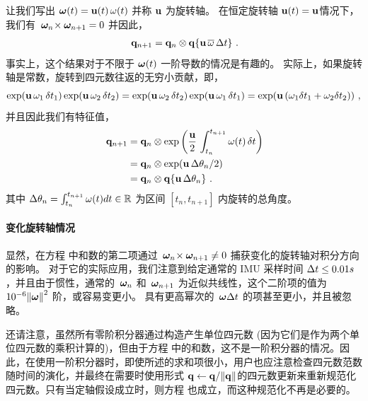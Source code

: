 让我们写出 ${\bm \omega}(t)={\bf u}(t)\,\omega(t)$ 并称 ${\bf u}$ 为旋转轴。
在恒定旋转轴 ${\bf u}(t) = {\bf u}$情况下，我们有 $\,{\bm \omega}_n\!\times\!\,{\bm \omega}_{n+1}=0$ 并因此，
%
\begin{align}\label{equ:first_order_constant_axis}
\,{\bf q}_{n+1} = {\bf q}_n\otimes{\bf q}\{{\bf u}\,\overline\omega\,\Delta t\}~.
\end{align}
%
事实上，这个结果对于不限于 ${\bm \omega}(t)$ 一阶导数的情况是有趣的。
实际上，如果旋转轴是常数，旋转到四元数往返的无穷小贡献，即， 
%
$$\exp ({\bf u}\,\omega_1\,\delta t_1)\exp ({\bf u}\,\omega_2\,\delta t_2)=\exp ({\bf u}\,\omega_2\,\delta t_2)\exp ({\bf u}\,\omega_1\,\delta t_1)=\exp ({\bf u}\,(\omega_1\delta t_1 + \omega_2\delta t_2))~,$$ 
%
并且因此我们有特征值，
%
\begin{subequations}
\begin{align}
\,{\bf q}_{n+1} 
  &= {\bf q}_n\otimes \exp\left(\frac{{\bf u}}2\,\int_{t_n}^{t_{n+1}}\omega(t)\,\delta t\right) \\
  &= {\bf q}_n\otimes \exp({\bf u}\,\Delta\theta_n/2) \\
  &= {\bf q}_n\otimes {\bf q}\{{\bf u}\,\Delta\theta_n\}~.
\end{align}
\end{subequations}
%
其中 $\Delta\theta_n = \int_{t_n}^{t_{n+1}} \omega(t)dt \in {\mathbb R}$ 为区间 $[t_n,t_{n+1}]$ 内旋转的总角度。


\paragraph{变化旋转轴情况}

显然，在方程  中和数的第二项通过 $\,{\bm \omega}_n\!\times\!\,{\bm \omega}_{n+1}\neq0$ 捕获变化的旋转轴对积分方向的影响。
对于它的实际应用，我们注意到给定通常的 IMU 采样时间 $\Delta t\le0.01s$，并且由于惯性，通常的 $\,{\bm \omega}_n$ 和 $\,{\bm \omega}_{n+1}$ 为近似共线性，这个二阶项的值为 $10^{-6}{\left\|{\bm \omega}\right\|}^2$ 阶，或容易变更小。 
具有更高幂次的 $\,{\bm \omega}\Delta t$ 的项甚至更小，并且被忽略。 


还请注意，虽然所有零阶积分器通过构造产生单位四元数 (因为它们是作为两个单位四元数的乘积计算的)，但由于方程  中的和数，这不是一阶积分器的情况。因此，在使用一阶积分器时，即使所述的求和项很小，用户也应注意检查四元数范数随时间的演化，并最终在需要时使用形式 ${\bf q}\gets{\bf q}/{\left\|{\bf q}\right\|}$的四元数更新来重新规范化四元数。只有当定轴假设成立时，则方程  也成立，而这种规范化不再是必要的。 


